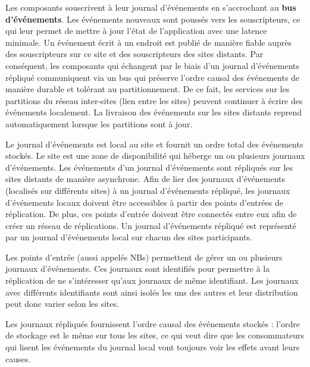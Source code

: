 Les composants souscrivent à leur journal d'événements en s'accrochant au 
\textbf{bus d'événements}.
Les événements nouveaux sont poussés vers les souscripteurs, 
ce qui leur permet de mettre à jour l'état de l'application avec une latence 
minimale. 
Un événement écrit à un endroit est publié de manière fiable auprès des souscripteurs sur 
ce site et des souscripteurs des sites distants. 
Par conséquent, les composants qui échangent par le biais d'un 
journal d'événements répliqué communiquent via un bus qui préserve l'ordre causal 
des événements de manière durable et tolérant au partitionnement. De ce fait, les 
services sur les partitions du réseau inter-sites (lien entre les sites) peuvent 
continuer à écrire des événements localement. La livraison des événements sur 
les sites distants reprend automatiquement lorsque les partitions sont à jour.


Le journal d'événements est local au site et fournit un ordre total des 
événements stockés. 
Le site est une zone de disponibilité qui héberge un ou plusieurs 
journaux d'événements. Les événements d'un journal d'événements sont 
répliqués sur les sites distants de manière asynchrone. 
Afin de lier des journaux d'événements (localisés sur différents sites) à un journal 
d'événements répliqué, les 
journaux d'événements locaux doivent être accessibles à partir des points 
d'entrées de réplication. De plus, ces points d'entrée doivent être 
connectés entre eux afin de créer un réseau de réplications. 
Un journal d'événements répliqué est représenté par un journal d'événements local 
sur chacun des sites participants.

Les points d'entrée (aussi appelés \glspl{NB})
permettent de gérer un ou plusieurs journaux d'événements. 
Ces journaux sont identifiés pour permettre à la réplication de ne s'intéresser 
qu'aux journaux de même identifiant. 
Les journaux avec différents identifiants sont ainsi isolés les uns des autres et 
leur distribution peut donc varier selon les sites.

Les journaux répliqués fournissent l'ordre causal des événements stockés : l'ordre 
de stockage est le même sur tous les sites, ce qui veut dire que les 
consommateurs qui lisent les événements du journal local vont toujours voir les 
effets avant leurs causes.
